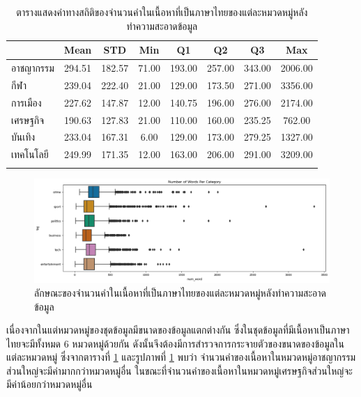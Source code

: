 \documentclass[12pt,oneside,openright,a4paper]{cpe-thai-project}
\begin{document}
\begin{itemize}
        \begin{longtable}[!ht]{lccccccc}
          \caption{ตารางแสดงค่าทางสถิติของจำนวนคำในเนื้อหาที่เป็นภาษาไทยของแต่ละหมวดหมู่หลังทำความสะอาดข้อมูล}
          \label{tbl:thai_stat}\\
          \hhline{========}
          \multicolumn{1}{c}{\textbf{หมวดหมู่}} & \textbf{Mean} & \textbf{STD} & \textbf{Min} & \textbf{Q1} & \textbf{Q2} & \textbf{Q3} & \textbf{Max}\\ \hline
          \endhead
          อาชญากรรม    & 294.51 & 182.57 & 71.00 & 193.00 & 257.00 & 343.00 & 2006.00  \\ %
          กีฬา          & 239.04 & 222.40 & 21.00 & 129.00 & 173.50 & 271.00 & 3356.00  \\ %
          การเมือง       & 227.62 & 147.87 & 12.00 & 140.75 & 196.00 & 276.00 & 2174.00  \\ %
          เศรษฐกิจ         & 190.63 & 127.83  & 21.00 & 110.00 & 160.00 & 235.25 & 762.00  \\ %
          บันเทิง        & 233.04 & 167.31 & 6.00 & 129.00 & 173.00 & 279.25 & 1327.00  \\ %
          เทคโนโลยี     & 249.99 & 171.35 & 12.00 & 163.00 & 206.00 & 291.00 & 3209.00  \\ \hhline{========}
        \end{longtable}
        \begin{figure}[!ht]\centering
          \includegraphics[width=\textwidth]{./img/thai_stat/boxplot_all.png}
          \caption{ลักษณะของจำนวนคำในเนื้อหาที่เป็นภาษาไทยของแต่ละหมวดหมู่หลังทําความสะอาดข้อมูล}\label{fig:thai_boxplot}
        \end{figure}
        \hspace{1cm}เนื่องจากในแต่หมวดหมู่ของชุดข้อมูลมีขนาดของข้อมูลแตกต่างกัน ซึ่งในชุดข้อมูลที่มีเนื้อหาเป็นภาษาไทยจะมีทั้งหมด 6 หมวดหมู่ด้วยกัน
        ดังนั้นจึงต้องมีการสำรวจการกระจายตัวของขนาดของข้อมูลในแต่ละหมวดหมู่ ซึ่งจากตารางที่ \ref{tbl:thai_stat} และรูปภาพที่ \ref{fig:thai_boxplot}
        พบว่า จำนวนคำของเนื้อหาในหมวดหมู่อาชญากรรมส่วนใหญ่จะมีค่ามากกว่าหมวดหมู่อื่น ในขณะที่จำนวนคำของเนื้อหาในหมวดหมู่เศรษฐกิจส่วนใหญ่จะมีค่าน้อยกว่าหมวดหมู่อื่น

\end{itemize}
\end{document}
